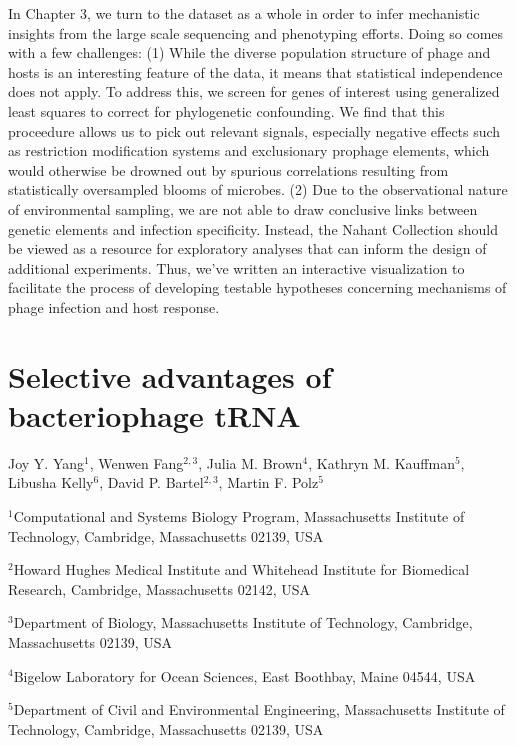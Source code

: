 \documentclass[12pt,twoside]{mitthesis-manusdown}
\begin{document}
In Chapter 3, we turn to the dataset as a whole in order to infer
mechanistic insights from the large scale sequencing and phenotyping
efforts. Doing so comes with a few challenges: (1) While the diverse
population structure of phage and hosts is an interesting feature of the
data, it means that statistical independence does not apply. To address
this, we screen for genes of interest using generalized least squares to
correct for phylogenetic confounding. We find that this proceedure
allows us to pick out relevant signals, especially negative effects such
as restriction modification systems and exclusionary prophage elements,
which would otherwise be drowned out by spurious correlations resulting
from statistically oversampled blooms of microbes. (2) Due to the
observational nature of environmental sampling, we are not able to draw
conclusive links between genetic elements and infection specificity.
Instead, the Nahant Collection should be viewed as a resource for
exploratory analyses that can inform the design of additional
experiments. Thus, we've written an interactive visualization to
facilitate the process of developing testable hypotheses concerning
mechanisms of phage infection and host response.

\chapter{Selective advantages of bacteriophage tRNA}\label{tRNA}

\singlespace
Joy Y. Yang\(^1\), Wenwen Fang\(^{2,3}\), Julia M. Brown\(^4\), Kathryn
M. Kauffman\(^5\), Libusha Kelly\(^6\), David P. Bartel\(^{2,3}\),
Martin F. Polz\(^5\) \newline 

\noindent \(^1\)Computational and Systems Biology Program, Massachusetts
Institute of Technology, Cambridge, Massachusetts 02139, USA

\noindent \(^2\)Howard Hughes Medical Institute and Whitehead Institute
for Biomedical Research, Cambridge, Massachusetts 02142, USA

\noindent \(^3\)Department of Biology, Massachusetts Institute of
Technology, Cambridge, Massachusetts 02139, USA

\noindent \(^4\)Bigelow Laboratory for Ocean Sciences, East Boothbay,
Maine 04544, USA

\noindent \(^5\)Department of Civil and Environmental Engineering,
Massachusetts Institute of Technology, Cambridge, Massachusetts 02139,
USA
\end{document}
